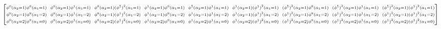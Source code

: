 \begin{landscape}
\begin{align*}
\begin{bmatrix}
        \scriptstyle \phi^0(\alpha_2=1) \phi^0(\alpha_1=1) & \hspace{-4pt} \scriptstyle \phi^0(\alpha_2=1) \phi^1(\alpha_1=1) & \hspace{-4pt} \scriptstyle \phi^0(\alpha_2=1) {(\phi^1)}^2(\alpha_1=1) & \hspace{-4pt} \scriptstyle \phi^1(\alpha_2=1) \phi^0(\alpha_1=1) & \hspace{-4pt} \scriptstyle \phi^1(\alpha_2=1) \phi^1(\alpha_1=1) & \hspace{-4pt} \scriptstyle \phi^1(\alpha_2=1) {(\phi^1)}^2(\alpha_1=1) & \hspace{-4pt} \scriptstyle {(\phi^1)}^2(\alpha_2=1) \phi^0(\alpha_1=1) & \hspace{-4pt} \scriptstyle {(\phi^1)}^2(\alpha_2=1) \phi^1(\alpha_1=1) & \hspace{-4pt} \scriptstyle {(\phi^1)}^2(\alpha_2=1) {(\phi^1)}^2(\alpha_1=1) \\ 
        \scriptstyle \phi^0(\alpha_2=1) \phi^0(\alpha_1=2) & \hspace{-4pt} \scriptstyle \phi^0(\alpha_2=1) \phi^1(\alpha_1=2) & \hspace{-4pt} \scriptstyle \phi^0(\alpha_2=1) {(\phi^1)}^2(\alpha_1=2) & \hspace{-4pt} \scriptstyle \phi^1(\alpha_2=1) \phi^0(\alpha_1=2) & \hspace{-4pt} \scriptstyle \phi^1(\alpha_2=1) \phi^1(\alpha_1=2) & \hspace{-4pt} \scriptstyle \phi^1(\alpha_2=1) {(\phi^1)}^2(\alpha_1=2) & \hspace{-4pt} \scriptstyle {(\phi^1)}^2(\alpha_2=1) \phi^0(\alpha_1=2) & \hspace{-4pt} \scriptstyle {(\phi^1)}^2(\alpha_2=1) \phi^1(\alpha_1=2) & \hspace{-4pt} \scriptstyle {(\phi^1)}^2(\alpha_2=1) {(\phi^1)}^2(\alpha_1=2) \\
        \scriptstyle \phi^0(\alpha_2=2) \phi^0(\alpha_1=0) & \hspace{-4pt} \scriptstyle \phi^0(\alpha_2=2) \phi^1(\alpha_1=0) & \hspace{-4pt} \scriptstyle \phi^0(\alpha_2=2) {(\phi^1)}^2(\alpha_1=0) & \hspace{-4pt} \scriptstyle \phi^1(\alpha_2=2) \phi^0(\alpha_1=0) & \hspace{-4pt} \scriptstyle \phi^1(\alpha_2=2) \phi^1(\alpha_1=0) & \hspace{-4pt} \scriptstyle \phi^1(\alpha_2=2) {(\phi^1)}^2(\alpha_1=0) & \hspace{-4pt} \scriptstyle {(\phi^1)}^2(\alpha_2=2) \phi^0(\alpha_1=0) & \hspace{-4pt} \scriptstyle {(\phi^1)}^2(\alpha_2=2) \phi^1(\alpha_1=0) & \hspace{-4pt} \scriptstyle {(\phi^1)}^2(\alpha_2=2) {(\phi^1)}^2(\alpha_1=0) \\

\end{bmatrix}
\end{align*}
\end{landscape}
